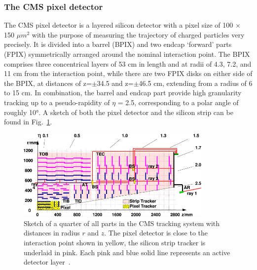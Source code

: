 \subsubsection*{The CMS pixel detector}
The CMS pixel detector is a layered silicon detector with a pixel size of 100 $\times$ 150 $\mu m^2$ with the purpose of measuring the
trajectory of charged particles very precisely. It is divided into
a barrel (BPIX) and two endcap `forward' parts (FPIX) symmetrically arranged around the nominal interaction point. The BPIX comprises three
concentrical layers of 53 cm in length and at radii of \num{4.3}, \num{7.2}, and \num{11} cm from the interaction point, while there are two FPIX 
disks on either side of the BPIX, at distances of z=$\pm$\num{34.5} and z=$\pm$\num{46.5} cm, extending from a radius of \num{6} to 15 cm.
In combination, the barrel and endcap part provide high granularity tracking up to a pseudo-rapidity of $\eta$ = 2.5, corresponding to a 
polar angle of roughly \ang{10}.
A sketch of both the pixel detector and the silicon strip can be found in Fig.~\ref{fig:tracker}.

\begin{figure}[h!]
    \centering
    \includegraphics[width=0.85\textwidth]{../figs/tracker.png}
    \caption{Sketch of a quarter of all parts in the CMS tracking system with distances in radius $r$ and $z$. The pixel detector is close to the
interaction point shown in yellow, the silicon strip tracker is underlaid in pink. Each pink and blue solid line represents an active
detector layer~\cite{cmstrackeralignment}.}
    \label{fig:tracker}
\end{figure}

